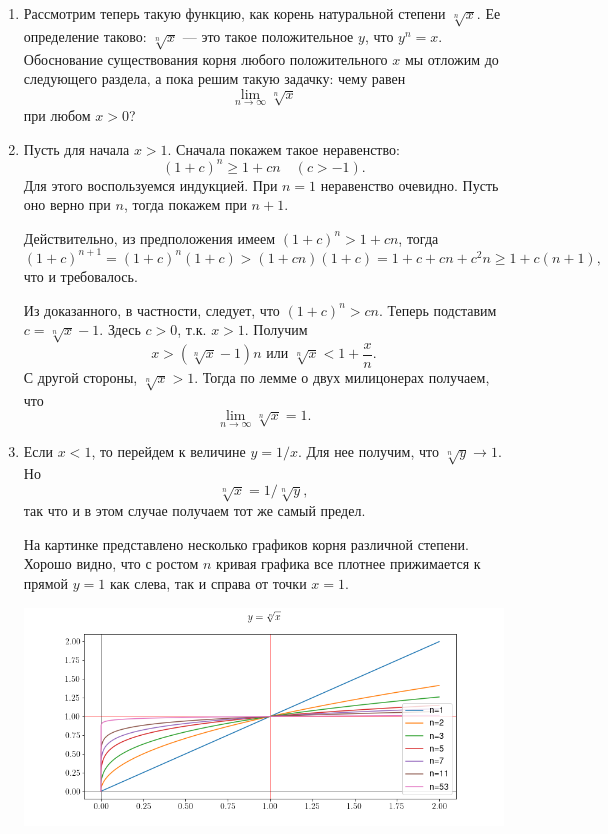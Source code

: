 \begin{enumerate}
\item Рассмотрим теперь такую функцию, как корень натуральной степени $\sqrt[n]{x}$. Ее определение таково: $\sqrt[n]{x}$ --- это такое положительное $y$, что $y^n=x$. Обоснование существования корня любого положительного $x$ мы отложим до следующего раздела, а пока решим такую задачку: чему равен 
$$
\lim_{n\to \infty}\sqrt[n]{x}
$$
при любом $x>0$?
\item Пусть для начала $x>1$. Сначала покажем такое неравенство:
$$
(1+c)^n\ge 1+cn\quad(c>-1).
$$
Для этого воспользуемся индукцией. При $n=1$ неравенство очевидно. Пусть оно верно при $n$, тогда покажем при $n+1$.

Действительно, из предположения имеем $(1+c)^n>1+cn$, тогда
$$
(1+c)^{n+1}=(1+c)^n(1+c)>(1+cn)(1+c)=1+c+cn+c^2n\ge 1+c(n+1),
$$
что и требовалось.

Из доказанного, в частности, следует, что $(1+c)^n>cn$. Теперь подставим $c=\sqrt[n]{x}-1$. Здесь $c>0$, т.к. $x>1$. Получим
$$
x>(\sqrt[n]{x}-1)n\mbox{ или }\sqrt[n]{x}<1+\frac xn.
$$
С другой стороны, $\sqrt[n]{x}>1$. Тогда по лемме о двух милицонерах получаем, что
$$
\lim_{n\to \infty}\sqrt[n]{x}=1.
$$

\item Если $x<1$, то перейдем к величине $y=1/x$. Для нее получим, что $\sqrt[n]{y}\to 1$. Но
$$
\sqrt[n]{x}=1/\sqrt[n]{y},
$$
так что и в этом случае получаем тот же самый предел.

На картинке представлено несколько графиков корня различной степени. Хорошо видно, что с ростом $n$ кривая графика все плотнее прижимается к прямой $y=1$ как слева, так и справа от точки $x=1$.
\begin{center}
\includegraphics[scale=0.5]{root.png}
\end{center}





\end{enumerate}
